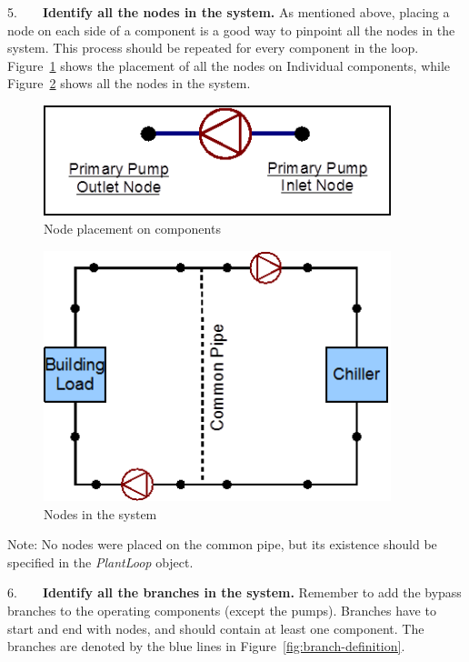 5.~~~~\textbf{Identify all the nodes in the system.} As mentioned above, placing a node on each side of a component is a good way to pinpoint all the nodes in the system. This process should be repeated for every component in the loop. Figure~\ref{fig:node-placement-on-components} shows the placement of all the nodes on Individual components, while Figure~\ref{fig:nodes-in-the-system} shows all the nodes in the system.

\begin{figure}[hbtp] %
\centering
\includegraphics[width=0.9\textwidth, height=0.9\textheight, keepaspectratio=true]{media/image006.png}
\caption{Node placement on components \protect \label{fig:node-placement-on-components}}
\end{figure}

\begin{figure}[hbtp] %
\centering
\includegraphics[width=0.9\textwidth, height=0.9\textheight, keepaspectratio=true]{media/image007.png}
\caption{Nodes in the system \protect \label{fig:nodes-in-the-system}}
\end{figure}

Note: No nodes were placed on the common pipe, but its existence should be specified in the \emph{PlantLoop} object.

6.~~~~\textbf{Identify all the branches in the system.} Remember to add the bypass branches to the operating components (except the pumps). Branches have to start and end with nodes, and should contain at least one component. The branches are denoted by the blue lines in Figure~\ref{fig:branch-definition}.


